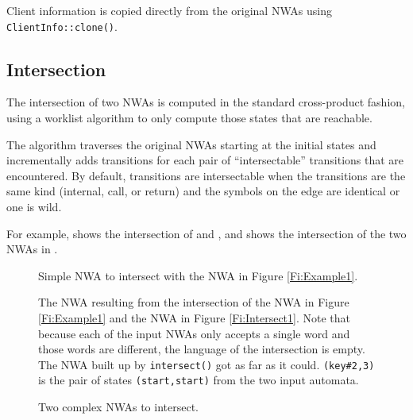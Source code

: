 Client information is copied directly from the original NWAs using
\texttt{ClientInfo::clone()}.


\subsection{Intersection}
\label{Se:Intersection}

The intersection of two NWAs is computed in the standard cross-product
fashion, using a worklist algorithm to only compute those states that
are reachable.

The algorithm traverses the original NWAs starting at
the initial states and incrementally adds transitions for each pair of
``intersectable'' transitions that are encountered. By default, transitions
are intersectable when the transitions are the same kind (internal, call,
or return) and the symbols on the edge are identical or one is wild.

For example,  shows the intersection of  and
, and  shows the intersection of the
two NWAs in .

 
\begin{figure}[tp]
  \centering
  \begin{minipage}{0.48\textwidth}
    \centering
    \caption{Simple NWA to intersect with the NWA in Figure \ref{Fi:Example1}.}
    \label{Fi:Intersect1}
  \end{minipage}\hspace{0.2cm}
  \begin{minipage}{0.49\textwidth}
    \centering
    \caption{The NWA resulting from the intersection of the NWA in Figure
      \ref{Fi:Example1} and the NWA in Figure \ref{Fi:Intersect1}. Note that
      because each of the input NWAs only accepts a single word and those
      words are different, the language of the intersection is empty. The NWA
    built up by \texttt{intersect()} got as far as it
    could. \texttt{(key\#2,3)} is the pair of states \texttt{(start,start)}
    from the two input automata.}
    \label{Fi:Intersect2}
  \end{minipage}
\end{figure}

\begin{figure}[p]
  \centering
  \caption{Two complex NWAs to intersect.}
  \label{Fi:Intersect3}
\end{figure}

